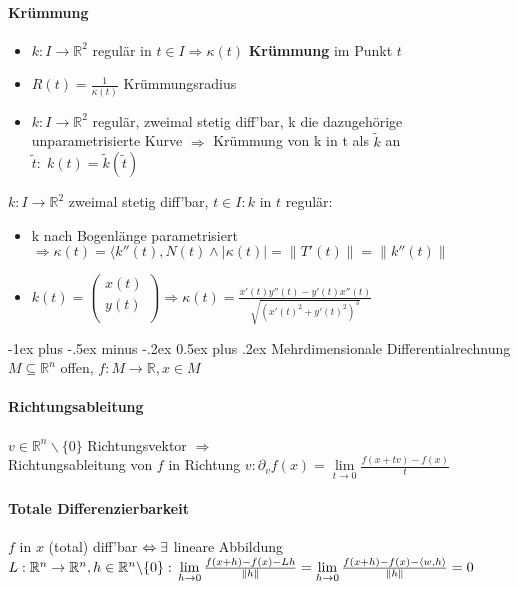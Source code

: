 \documentclass[paper=a3,paper=landscape, fontsize=9pt, DIV=30]{scrartcl}
\makeatletter
\newcommand{\real}{{\mathbb{R}}}
\renewcommand{\section}{\@startsection{section}{1}{0mm}%
  {-1ex plus -.5ex minus -.2ex}%
  {0.5ex plus .2ex}%
  {\color{blue}\normalfont\large\bfseries}}
\makeatother
\begin{document}
\begin{multicols*}{4}
  \paragraph{Krümmung}
  \begin{itemize}
  	\item $k: I \rightarrow \real^2$ regulär in $t \in I \Rightarrow \kappa(t)$ \textbf{Krümmung} im Punkt $t$
  	\item $R(t) = \frac{1}{\kappa(t)}$ Krümmungsradius
  	\item $k: I \rightarrow \real^2$ regulär, zweimal stetig diff'bar, k die dazugehörige unparametrisierte Kurve $\Rightarrow$ Krümmung von k in t als $\tilde{k}$ an $\tilde{t}:\;k(t)=\tilde{k}(\tilde{t})$
  \end{itemize}
	$k: I \rightarrow \real^2$ zweimal stetig diff'bar, $t \in I: k$ in $t$ regulär:
	\begin{itemize}
		\item k nach Bogenlänge parametrisiert $\Rightarrow \kappa(t)=\langle k''(t), N(t) \wedge \lvert \kappa(t)\rvert = \lVert T'(t) \rVert = \lVert k''(t) \rVert$
		\item $k(t) =
		\begin{pmatrix}
			x(t)\\y(t)\\
		\end{pmatrix}
		\Rightarrow \kappa(t)=\frac{x'(t)y''(t)-y'(t)x''(t)}{\sqrt{(x'(t)^2+y'(t)^2)^3}}$
	\end{itemize}
  \section{Mehrdimensionale Differentialrechnung}
	$M \subseteq \real^n$ offen, $f: M \rightarrow \real, x \in M$
	\paragraph{Richtungsableitung}
	$ v \in \real^n \backslash \{0\}$ Richtungsvektor $\Rightarrow$\\Richtungsableitung von $f$ in Richtung $v: \partial_vf(x)= \lim\limits_{t \rightarrow 0} \frac{f(x+tv)-f(x)}{t}$

  \paragraph{Totale Differenzierbarkeit}
$f$ in $x$ (total) diff'bar $\Leftrightarrow\\
\exists$ lineare Abbildung $L: \real^n \rightarrow \real^n, h \in \real^n \backslash \{0\}:\\
\lim\limits_{h \rightarrow 0} \frac{f(x+h)-f(x)-Lh}{\lVert h \rVert} = \lim\limits_{h \rightarrow 0} \frac{f(x+h)-f(x)-\langle w,h \rangle}{\lVert h \rVert} = 0$


\end{multicols*}
\end{document}
